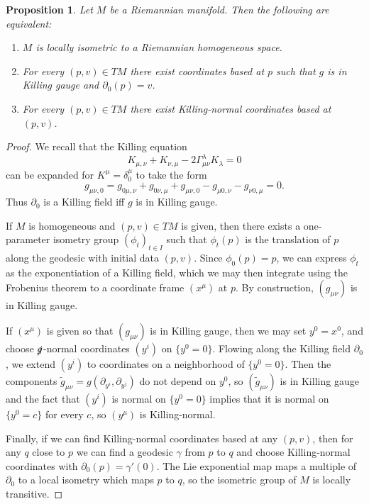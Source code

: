 \documentclass[reqno,12pt,letterpaper]{amsart}
\newtheorem{proposition}[theorem]{Proposition}
\theoremstyle{definition}
\numberwithin{equation}{section}
\begin{document}
\begin{proposition}
Let $M$ be a Riemannian manifold. Then the following are equivalent:
\begin{enumerate}
\item $M$ is locally isometric to a Riemannian homogeneous space.
\item For every $(p, v) \in TM$ there exist coordinates based at $p$ such that $g$ is in Killing gauge and $\partial_0(p) = v$.
\item For every $(p, v) \in TM$ there exist Killing-normal coordinates based at $(p, v)$.
\end{enumerate}
\end{proposition}
\begin{proof}
We recall that the Killing equation
$$K_{\mu,\nu} + K_{\nu,\mu} - 2\Gamma^\lambda_{\mu\nu} K_\lambda = 0$$
can be expanded for $K^\mu = \delta_0^\mu$ to take the form
$$g_{\mu \nu, 0} =  g_{0 \mu, \nu} + g_{0 \nu, \mu} + g_{\mu \nu, 0} - g_{\mu 0, \nu} - g_{\nu 0, \mu} = 0.$$
Thus $\partial_0$ is a Killing field iff $g$ is in Killing gauge.

If $M$ is homogeneous and $(p, v) \in TM$ is given, then there exists a one-parameter isometry group $(\phi_t)_{t \in I}$ such that $\phi_t(p)$ is the translation of $p$ along the geodesic with initial data $(p, v)$.
Since $\phi_0(p) = p$, we can express $\phi_t$ as the exponentiation of a Killing field, which we may then integrate using the Frobenius theorem to a coordinate frame $(x^\mu)$ at $p$.
By construction, $(g_{\mu\nu})$ is in Killing gauge.

If $(x^\mu)$ is given so that $(g_{\mu\nu})$ is in Killing gauge, then we may set $y^0 = x^0$, and choose $\slashed g$-normal coordinates $(y^i)$ on $\{y^0 = 0\}$.
Flowing along the Killing field $\partial_0$, we extend $(y^i)$ to coordinates on a neighborhood of $\{y^0 = 0\}$.
Then the components $\tilde g_{\mu\nu} = g(\partial_{y^i}, \partial_{y^j})$ do not depend on $y^0$, so $(\tilde g_{\mu\nu})$ is in Killing gauge and the fact that $(y^i)$ is normal on $\{y^0 = 0\}$ implies that it is normal on $\{y^0 = c\}$ for every $c$, so $(y^\mu)$ is Killing-normal.

Finally, if we can find Killing-normal coordinates based at any $(p, v)$, then for any $q$ close to $p$ we can find a geodesic $\gamma$ from $p$ to $q$ and choose Killing-normal coordinates with $\partial_0(p) = \gamma'(0)$.
The Lie exponential map maps a multiple of $\partial_0$ to a local isometry which maps $p$ to $q$, so the isometric group of $M$ is locally transitive.
\end{proof}
\end{document}
